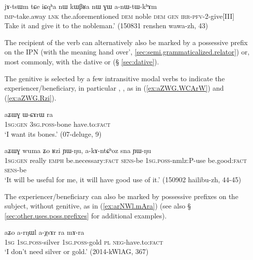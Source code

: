 \begin{exe}
\ex \label{ex:GW.anWtWkhAm}
 \gll jɤ-tsɯm tɕe iɕqʰa nɯ kɯβʁa nɯ ɣɯ a-nɯ-tɯ-kʰɤm \\
 \textsc{imp}-take.away \textsc{lnk} the.aforementioned \textsc{dem} noble \textsc{dem} \textsc{gen} \textsc{irr}-\textsc{pfv}-2-give[III] \\
 \glt  Take it and give it to the nobleman.' (150831 renshen wawa-zh, 43)
\end{exe}
 
The recipient of the verb   can alternatively also be marked by a possessive prefix on the IPN  (with the meaning  hand over', \ref{sec:semi.grammaticalized.relator}) or, most commonly, with the dative  or  (§ \ref{sec:dative}).

The genitive is selected by a few intransitive modal verbs to indicate the experiencer/beneficiary, in particular  , , as in (\ref{ex:aZWG.WCArW}) and (\ref{ex:aZWG.Rzi}).

\begin{exe}
\ex \label{ex:aZWG.WCArW}
 \gll aʑɯɣ ɯ-ɕɤrɯ ra \\
 \textsc{1sg:gen} \textsc{3sg.poss}-bone have.to:\textsc{fact} \\
\glt `I want its bones.' (07-deluge, 9)
\end{exe}

\begin{exe}
\ex \label{ex:aZWG.Rzi}
 \gll aʑɯɣ wuma ʑo ʁzi ɲɯ-ŋu, a-kɤ-ntɕʰoz sna ɲɯ-ŋu \\
  \textsc{1sg:gen} really \textsc{emph} be.necessary:\textsc{fact} \textsc{sens}-be \textsc{1sg}.\textsc{poss}-nmlz:P-use be.good:\textsc{fact}  \textsc{sens}-be \\
  \glt `It will be useful for me, it will have good use of it.'  (150902 hailibu-zh, 44-45)
\end{exe}

The experiencer/beneficiary can also be marked by possessive prefixes on the subject, without genitive, as in 
(\ref{ex:arNWl.mAra}) (see also § \ref{sec:other.uses.poss.prefixes} for additional examples).

\begin{exe}
\ex \label{ex:arNWl.mAra}
 \gll aʑo a-rŋɯl a-χsɤr ra mɤ-ra \\
 \textsc{1sg} \textsc{1sg}.\textsc{poss}-silver \textsc{1sg}.\textsc{poss}-gold \textsc{pl} \textsc{neg}-have.to:\textsc{fact} \\
 \glt `I don't  need silver or gold.' (2014-kWlAG, 367)
\end{exe}


